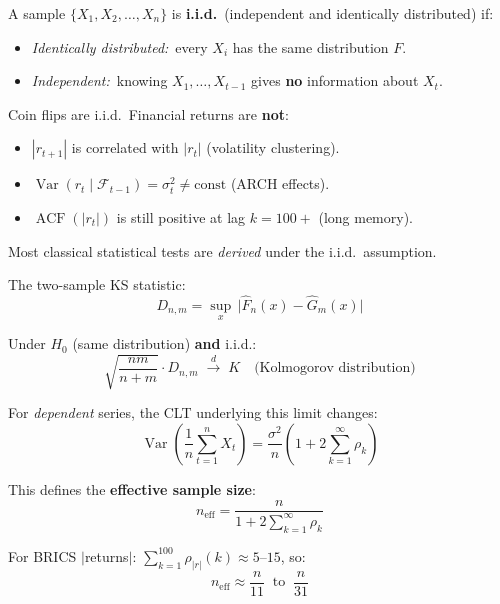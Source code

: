 \documentclass[10pt]{article}
\newcommand{\navybox}[2]{\begin{tcolorbox}[mybox={Navy}{LBg},title={#1}]#2\end{tcolorbox}}
\newcommand{\skybox}[2]{\begin{tcolorbox}[mybox={Sky}{BBg},title={#1}]#2\end{tcolorbox}}
\begin{document}
\begin{multicols}{2}

\navybox{What Does i.i.d.\ Mean?}{%
A sample $\{X_1, X_2, \ldots, X_n\}$ is \textbf{i.i.d.}\ (independent and identically distributed) if:
\begin{itemize}
  \item \textit{Identically distributed:}\ every $X_i$ has the same distribution $F$.
  \item \textit{Independent:}\ knowing $X_1,\ldots,X_{t-1}$ gives \textbf{no} information about $X_t$.
\end{itemize}
Coin flips are i.i.d.\ Financial returns are \textbf{not}:
\begin{itemize}
  \item $|r_{t+1}|$ is correlated with $|r_t|$ (volatility clustering).
  \item $\operatorname{Var}(r_t \mid \mathcal{F}_{t-1}) = \sigma^2_t \neq \text{const}$ (ARCH effects).
  \item $\operatorname{ACF}(|r_t|)$ is still positive at lag $k=100{+}$ (long memory).
\end{itemize}
Most classical statistical tests are \emph{derived} under the i.i.d.\ assumption.}

\skybox{The Kolmogorov--Smirnov Test and Its Failure}{%
The two-sample KS statistic:
\begin{equation*}
  D_{n,m} = \sup_x\, \bigl|\hat{F}_n(x) - \hat{G}_m(x)\bigr|
\end{equation*}

Under $H_0$ (same distribution) \textbf{and} i.i.d.:
\begin{equation*}
  \sqrt{\frac{nm}{n+m}}\cdot D_{n,m} \;\xrightarrow{d}\; K \quad\text{(Kolmogorov distribution)}
\end{equation*}

For \emph{dependent} series, the CLT underlying this limit changes:
\begin{equation*}
  \operatorname{Var}\!\left(\frac{1}{n}\sum_{t=1}^n X_t\right)
  = \frac{\sigma^2}{n}\!\left(1 + 2\sum_{k=1}^{\infty}\rho_k\right)
\end{equation*}

This defines the \textbf{effective sample size}:
\begin{equation*}
  n_\text{eff} = \frac{n}{1 + 2\displaystyle\sum_{k=1}^{\infty}\rho_k}
\end{equation*}

For BRICS $|$returns$|$: $\sum_{k=1}^{100}\rho_{|r|}(k) \approx 5$--$15$, so:
\begin{equation*}
  n_\text{eff} \approx \frac{n}{11}\ \text{ to }\ \frac{n}{31}
\end{equation*}

}
\end{multicols}
\end{document}
